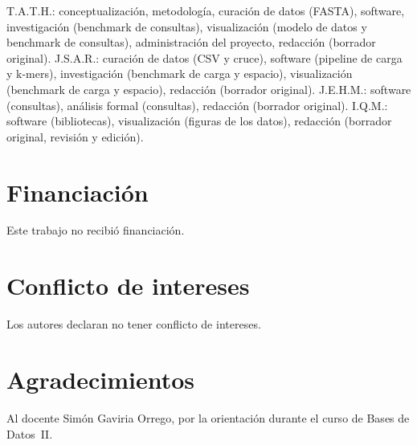 \documentclass[unnumsec,namedate,webpdf,contemporary,large]{oup-authoring-template}
\begin{document}
T.A.T.H.: conceptualizaci\'on, metodolog\'ia, curaci\'on de datos (FASTA), software, investigaci\'on (benchmark de consultas), visualizaci\'on (modelo de datos y benchmark de consultas), administraci\'on del proyecto, redacci\'on (borrador original). J.S.A.R.: curaci\'on de datos (CSV y cruce), software (pipeline de carga y k-mers), investigaci\'on (benchmark de carga y espacio), visualizaci\'on (benchmark de carga y espacio), redacci\'on (borrador original). J.E.H.M.: software (consultas), an\'alisis formal (consultas), redacci\'on (borrador original). I.Q.M.: software (bibliotecas), visualizaci\'on (figuras de los datos), redacci\'on (borrador original, revisi\'on y edici\'on).

\section{Financiaci\'on}

Este trabajo no recibi\'o financiaci\'on.

\section{Conflicto de intereses}

Los autores declaran no tener conflicto de intereses.

\section{Agradecimientos}

Al docente Sim\'on Gaviria Orrego, por la orientaci\'on durante el curso de Bases de Datos~II.



\end{document}
